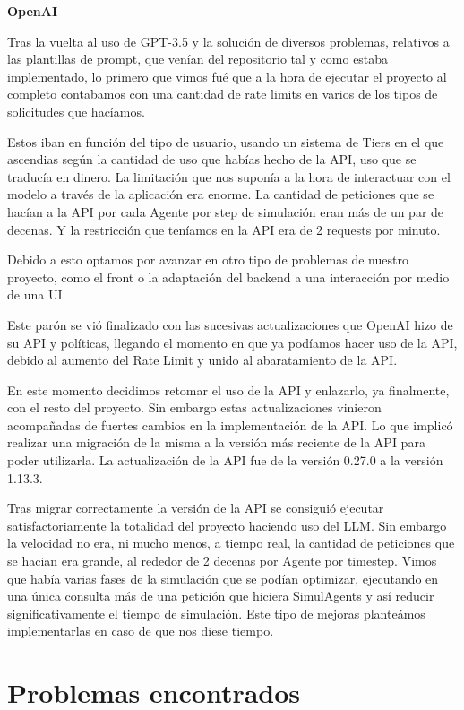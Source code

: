 \textbf{OpenAI}

Tras la vuelta al uso de GPT-3.5 y la solución de diversos problemas, relativos a las plantillas de prompt, que venían del repositorio tal y como estaba implementado, lo primero que vimos fué que a la hora de ejecutar el proyecto al completo contabamos con una cantidad de rate limits en varios de los tipos de solicitudes que hacíamos.

Estos iban en función del tipo de usuario, usando un sistema de Tiers en el que ascendias según la cantidad de uso que habías hecho de la API, uso que se traducía en dinero. La limitación que nos suponía a la hora de interactuar con el modelo a través de la aplicación era enorme. La cantidad de peticiones que se hacían a la API por cada Agente por step de simulación eran más de un par de decenas. Y la restricción que teníamos en la API era de 2 requests por minuto.

Debido a esto optamos por avanzar en otro tipo de problemas de nuestro proyecto, como el front o la adaptación del backend a una interacción por medio de una UI.

Este parón se vió finalizado con las sucesivas actualizaciones que OpenAI hizo de su API y políticas, llegando el momento en que ya podíamos hacer uso de la API, debido al aumento del Rate Limit y unido al abaratamiento de la API.

En este momento decidimos retomar el uso de la API y enlazarlo, ya finalmente, con el resto del proyecto. Sin embargo estas actualizaciones vinieron acompañadas de fuertes cambios en la implementación de la API. Lo que implicó realizar una migración de la misma a la versión más reciente de la API para poder utilizarla. La actualización de la API fue de la versión 0.27.0 a la versión 1.13.3. 

Tras migrar correctamente la versión de la API se consiguió ejecutar satisfactoriamente la totalidad del proyecto haciendo uso del LLM. Sin embargo la velocidad no era, ni mucho menos, a tiempo real, la cantidad de peticiones que se hacian era grande, al rededor de 2 decenas por Agente por timestep. Vimos que había varias fases de la simulación que se podían optimizar, ejecutando en una única consulta más de una petición que hiciera SimulAgents y así reducir significativamente el tiempo de simulación. Este tipo de mejoras planteámos implementarlas en caso de que nos diese tiempo.

\section{Problemas encontrados}

